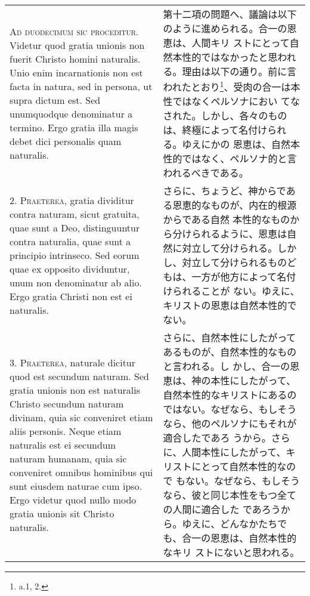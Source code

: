 \documentclass[10pt]{jsarticle} %
\begin{document}
\begin{longtable}{p{21em}p{21em}}



{\Huge A}{\scshape d duodecimum sic proceditur}. Videtur quod gratia
unionis non fuerit Christo homini naturalis. Unio enim incarnationis
non est facta in natura, sed in persona, ut supra dictum est. Sed
unumquodque denominatur a termino. Ergo gratia illa magis debet dici
personalis quam naturalis.


&

第十二項の問題へ、議論は以下のように進められる。合一の恩恵は、人間キリ
ストにとって自然本性的ではなかったと思われる。理由は以下の通り。前に言
われたとおり\footnote{a.1, 2.}、受肉の合一は本性ではなくペルソナにおい
てなされた。しかし、各々のものは、終極によって名付けられる。ゆえにかの
恩恵は、自然本性的ではなく、ペルソナ的と言われるべきである。


\\



2. {\scshape Praeterea}, gratia dividitur contra naturam, sicut
gratuita, quae sunt a Deo, distinguuntur contra naturalia, quae sunt a
principio intrinseco. Sed eorum quae ex opposito dividuntur, unum non
denominatur ab alio. Ergo gratia Christi non est ei naturalis.


&


さらに、ちょうど、神からである恩恵的なものが、内在的根源からである自然
本性的なものから分けられるように、恩恵は自然に対立して分けられる。しか
し、対立して分けられるものどもは、一方が他方によって名付けられることが
ない。ゆえに、キリストの恩恵は自然本性的でない。

\\



3. {\scshape Praeterea}, naturale dicitur quod est secundum
naturam. Sed gratia unionis non est naturalis Christo secundum naturam
divinam, quia sic conveniret etiam aliis personis. Neque etiam
naturalis est ei secundum naturam humanam, quia sic conveniret omnibus
hominibus qui sunt eiusdem naturae cum ipso. Ergo videtur quod nullo
modo gratia unionis sit Christo naturalis.


&

さらに、自然本性にしたがってあるものが、自然本性的なものと言われる。し
かし、合一の恩恵は、神の本性にしたがって、自然本性的なキリストにあるの
ではない。なぜなら、もしそうなら、他のペルソナにもそれが適合したであろ
うから。さらに、人間本性にしたがって、キリストにとって自然本性的なので
もない。なぜなら、もしそうなら、彼と同じ本性をもつ全ての人間に適合した
であろうから。ゆえに、どんなかたちでも、合一の恩恵は、自然本性的なキリ
ストにないと思われる。



\end{longtable}
\end{document}
